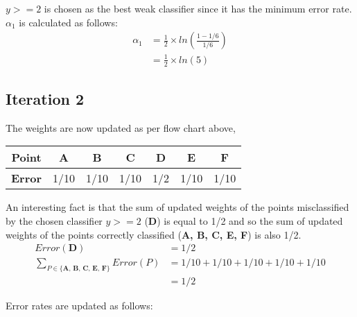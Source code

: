 \documentclass[11pt, a4paper]{article}
\begin{document}
$y >= 2$ is chosen as the best weak classifier since it has the minimum error rate. $\alpha_1$ is calculated as follows: 
\begin{align*}
	\alpha_1 & = \frac{1}{2} \times ln(\frac{1-1/6}{1/6}) \\
	         & = \frac{1}{2} \times ln(5)                 
\end{align*}

\subsection{Iteration 2}
The weights are now updated as per flow chart above, 

\FloatBarrier
\begin{table}[htbp]
	\centering
	\begin{tabular}{|c|c|c|c|c|c|c|}
		\toprule
		\textbf{Point} & \textbf{A} & \textbf{B} & \textbf{C} & \textbf{D} & \textbf{E} & \textbf{F} \\
		\midrule
		\textbf{Error} & 1/10       & 1/10       & 1/10       & 1/2        & 1/10       & 1/10       \\
		\hline
	\end{tabular}
\end{table}

An interesting fact is that the sum of updated weights of the points misclassified by the chosen classifier $y >= 2$ (\textbf{D}) is equal to 1/2 and so the sum of updated weights of the points correctly classified (\textbf{A, B, C, E, F}) is also 1/2. 
\begin{align*}
	Error(\textbf{D})                                      & = 1/2                              \\
	\sum\limits_{P \in \{\textbf{A, B, C, E, F}\}}Error(P) & = 1/10 + 1/10 + 1/10 + 1/10 + 1/10 \\
	                                                       & = 1/2                              
\end{align*}

Error rates are updated as follows: 
\end{document}
